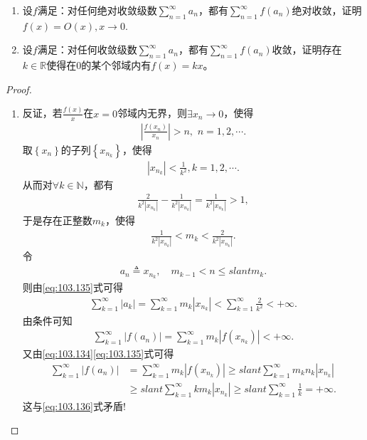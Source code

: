 \documentclass[../../main.tex]{subfiles}
\begin{document}
\begin{example}
\begin{enumerate}
\item 设$f$满足：对任何绝对收敛级数$\sum_{n=1}^{\infty} a_n$，都有$\sum_{n=1}^{\infty} f(a_n)$绝对收敛，证明$f(x) = O(x),x\to 0$.

\item 设$f$满足：对任何收敛级数$\sum_{n=1}^{\infty} a_n$，都有$\sum_{n=1}^{\infty} f(a_n)$收敛，证明存在$k \in \mathbb{R}$使得在0的某个邻域内有$f(x) = kx$。
\end{enumerate}
\end{example}
\begin{proof}
\begin{enumerate}
\item 反证，若$\frac{f\left( x \right)}{x}$在$x=0$邻域内无界，则$\exists x_n\rightarrow 0$，使得
\begin{align}
\left| \frac{f\left( x_n \right)}{x_n} \right|>n,\,\,n=1,2,\cdots .
\label{eq:103.134}
\end{align}
取$\left\{ x_n \right\}$的子列$\left\{ x_{n_k} \right\}$，使得
\begin{align*}
\left| x_{n_k} \right|<\frac{1}{k^2},k=1,2,\cdots .
\end{align*}
从而对$\forall k\in \mathbb{N}$，都有
\begin{align*}
\frac{2}{k^2\left| x_{n_k} \right|}-\frac{1}{k^2\left| x_{n_k} \right|}=\frac{1}{k^2\left| x_{n_k} \right|}>1,
\end{align*}
于是存在正整数$m_k$，使得
\begin{align}
\frac{1}{k^2\left| x_{n_k} \right|}<m_k<\frac{2}{k^2\left| x_{n_k} \right|}.
\label{eq:103.135}
\end{align}
令
\begin{align*}
a_n\triangleq x_{n_k},\quad m_{k-1}<n\leqslant slant m_k.
\end{align*}
则由\eqref{eq:103.135}式可得
\begin{align*}
\sum_{k=1}^{\infty}{\left| a_k \right|}=\sum_{k=1}^{\infty}{m_k\left| x_{n_k} \right|}<\sum_{k=1}^{\infty}{\frac{2}{k^2}}<+\infty .
\end{align*}
由条件可知
\begin{align}
\sum_{k=1}^{\infty}{\left| f\left( a_n \right) \right|}=\sum_{k=1}^{\infty}{m_k\left| f\left( x_{n_k} \right) \right|}<+\infty .
\label{eq:103.136}
\end{align}
又由\eqref{eq:103.134}\eqref{eq:103.135}式可得
\begin{align*}
\sum_{k=1}^{\infty}{\left| f\left( a_n \right) \right|}&=\sum_{k=1}^{\infty}{m_k\left| f\left( x_{n_k} \right) \right|}\geqslant slant \sum_{k=1}^{\infty}{m_kn_k\left| x_{n_k} \right|}\\
&\geqslant slant \sum_{k=1}^{\infty}{km_k\left| x_{n_k} \right|}\geqslant slant \sum_{k=1}^{\infty}{\frac{1}{k}}=+\infty .
\end{align*}
这与\eqref{eq:103.136}式矛盾!


\end{enumerate}
\end{proof}
\end{document}
